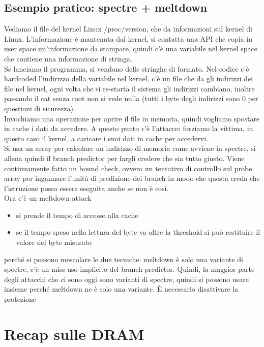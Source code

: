 \documentclass[12pt, oneside]{extbook} %
\begin{document}
\section*{Esempio pratico: spectre + meltdown}
Vediamo il file del kernel Linux \textsf{/proc/version}, che da informazioni sul kernel di Linux. L'informazione è mantenuta dal kernel, si contatta una API che copia in user space un'informazione da stampare, quindi c'è una variabile nel kernel space che contiene una informazione di stringa.\\Se lanciamo il programma, si vendono delle stringhe di formato. Nel codice c'è hardcoded l'indirizzo della variabile nel kernel, c'è un file che da gli indirizzi dei file nel kernel, ogni volta che si re-starta il sistema gli indirizzi cambiano, inoltre passando il cat senza root non si vede nulla (tutti i byte degli indirizzi sono 0 per questioni di sicurezza).\\ Invochiamo una operazione per aprire il file in memoria, quindi vogliamo spostare in cache i dati da accedere. A questo punto c'è l'attacco: forziamo la vittima, in questo caso il kernel, a caricare i suoi dati in cache per accedervi.\\Si usa un array per calcolare un indirizzo di memoria come avviene in spectre, si allena quindi il branch predictor per fargli credere che sia tutto giusto. Viene continuamente fatto un bound check, ovvero un tentativo di controllo sul probe array per ingannare l'unità di predizione dei branch in modo che questa creda che l'istruzione possa essere eseguita anche se non è così.\\Ora c'è un meltdown attack
\begin{itemize}
\item si prende il tempo di accesso alla cache
\item se il tempo speso nella lettura del byte va oltre la threshold si può restituire il valore del byte misurato
\end{itemize}
perché si possono mescolare le due tecniche: meltdown è solo una variante di spectre, c'è un miss-uso implicito del branch predictor. Quindi, la maggior parte degli attacchi che ci sono oggi sono varianti di spectre, quindi si possono usare insieme perché meltdown ne è solo una variante. È necessario disattivare la protezione

\chapter{Recap sulle DRAM}
\end{document}
